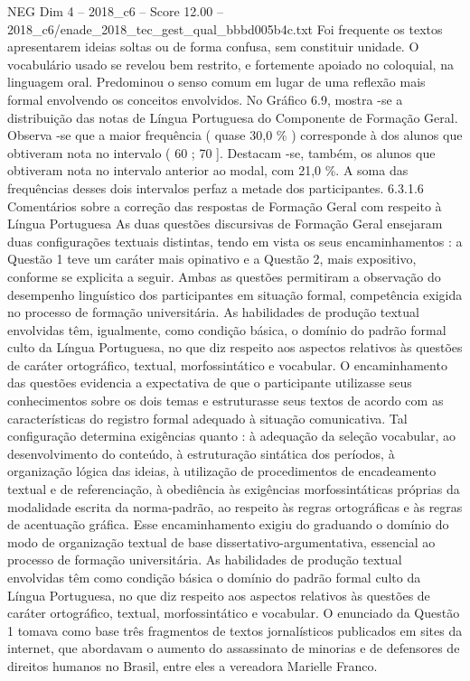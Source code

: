 \begin{textsample}{NEG Dim 4 – 2018\_c6 – Score 12.00 – 2018\_c6/enade\_2018\_tec\_gest\_qual\_bbbd005b4c.txt}
Foi frequente os textos apresentarem ideias soltas ou de forma confusa, sem constituir unidade.
O vocabulário usado se revelou bem restrito, e fortemente apoiado no coloquial, na linguagem oral.
Predominou o senso comum em lugar de uma reflexão mais formal envolvendo os conceitos envolvidos.
No Gráfico 6.9, mostra -se a distribuição das notas de Língua Portuguesa do Componente de Formação Geral.
Observa -se que a maior frequência ( quase 30,0 \% ) corresponde à dos alunos que obtiveram nota no intervalo ( 60 ; 70 ].
Destacam -se, também, os alunos que obtiveram nota no intervalo anterior ao modal, com 21,0 \%.
A soma das frequências desses dois intervalos perfaz a metade dos participantes. 6.3.1.6 Comentários sobre a correção das respostas de Formação Geral com respeito à Língua Portuguesa As duas questões discursivas de Formação Geral ensejaram duas configurações textuais distintas, tendo em vista os seus encaminhamentos : a Questão 1 teve um caráter mais opinativo e a Questão 2, mais expositivo, conforme se explicita a seguir.
Ambas as questões permitiram a observação do desempenho linguístico dos participantes em situação formal, competência exigida no processo de formação universitária.
As habilidades de produção textual envolvidas têm, igualmente, como condição básica, o domínio do padrão formal culto da Língua Portuguesa, no que diz respeito aos aspectos relativos às questões de caráter ortográfico, textual, morfossintático e vocabular.
O encaminhamento das questões evidencia a expectativa de que o participante utilizasse seus conhecimentos sobre os dois temas e estruturasse seus textos de acordo com as características do registro formal adequado à situação comunicativa.
Tal configuração determina exigências quanto : à adequação da seleção vocabular, ao desenvolvimento do conteúdo, à estruturação sintática dos períodos, à organização lógica das ideias, à utilização de procedimentos de encadeamento textual e de referenciação, à obediência às exigências morfossintáticas próprias da modalidade escrita da norma-padrão, ao respeito às regras ortográficas e às regras de acentuação gráfica.
Esse encaminhamento exigiu do graduando o domínio do modo de organização textual de base dissertativo-argumentativa, essencial ao processo de formação universitária.
As habilidades de produção textual envolvidas têm como condição básica o domínio do padrão formal culto da Língua Portuguesa, no que diz respeito aos aspectos relativos às questões de caráter ortográfico, textual, morfossintático e vocabular.
O enunciado da Questão 1 tomava como base três fragmentos de textos jornalísticos publicados em sites da internet, que abordavam o aumento do assassinato de minorias e de defensores de direitos humanos no Brasil, entre eles a vereadora Marielle Franco.

\end{textsample}
